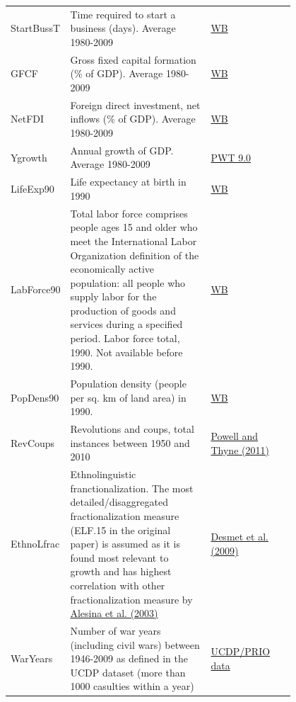 \documentclass[a4paper,11pt]{article}
\begin{document}
\begin{center}
\begin{longtable}{l p{0.50\linewidth} p{0.3\linewidth}}
			StartBussT & Time required to start a business (days). Average 1980-2009 & \href{http://data.worldbank.org/indicator/IC.REG.DURS}{WB} \\
			
			GFCF & Gross fixed capital formation (\% of GDP). Average 1980-2009 & \href{http://data.worldbank.org/indicator/NE.GDI.FTOT.ZS}{WB} \\
			
			NetFDI &  Foreign direct investment, net inflows (\% of GDP). Average 1980-2009 & \href{http://data.worldbank.org/indicator/BX.KLT.DINV.WD.GD.ZS}{WB} \\
			
			Ygrowth & Annual growth of GDP. Average 1980-2009 & \href{http://www.rug.nl/research/ggdc/data/pwt/pwt-9.0}{PWT 9.0} \\
			
			LifeExp90 & Life expectancy at birth in 1990 & \href{http://data.worldbank.org/indicator/SP.DYN.LE00.IN}{WB}\\
			
			LabForce90 & Total labor force comprises people ages 15 and older who meet the International Labor Organization definition of the economically active population: all people who supply labor for the production of goods and services during a specified period. Labor force total, 1990. Not available before 1990. & \href{http://data.worldbank.org/indicator/SL.TLF.CACT.ZS}{WB} \\
			
			PopDens90 & Population density (people per sq. km of land area) in 1990. & \href{http://data.worldbank.org/indicator/EN.POP.DNST}{WB} \\
			
			RevCoups & Revolutions and coups, total instances between 1950 and 2010 & \href{http://jpr.sagepub.com/content/48/2/249.abstract}{Powell and Thyne (2011)} \\
			
			EthnoLfrac & Ethnolinguistic franctionalization. The most detailed/disaggregated fractionalization measure (ELF.15 in the original paper) is assumed as it is found most relevant to growth and has highest correlation with other fractionalization measure by \href{http://www.nsd.uib.no/macrodataguide/set.html?id=16&sub=1}{Alesina et al. (2003)} & \href{http://www.anderson.ucla.edu/faculty_pages/romain.wacziarg/papersum.html}{Desmet et al. (2009)} \\
			
			WarYears & Number of war years (including civil wars) between 1946-2009 as defined in the UCDP dataset (more than 1000 casulties within a year) & \href{http://www.pcr.uu.se/research/ucdp/datasets/ucdp_prio_armed_conflict_dataset/}{UCDP/PRIO data} \\
			

\end{longtable}
\end{center}
\end{document}
